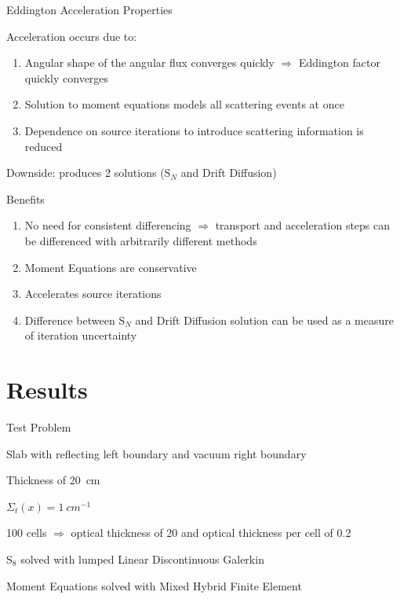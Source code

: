 \documentclass[10pt]{beamer}
\newcommand{\SN}{S$_N$\xspace}
\begin{document}
\begin{frame}{Eddington Acceleration Properties}
    
    Acceleration occurs due to: 
    \begin{enumerate}
    	\item Angular shape of the angular flux converges quickly $\Rightarrow$ Eddington factor quickly converges 

    	\item Solution to moment equations models all scattering events at once 

    	\item Dependence on source iterations to introduce scattering information is reduced

    \end{enumerate}

    Downside: produces 2 solutions (\SN and Drift Diffusion)

    Benefits 
    \begin{enumerate}
    	\item No need for consistent differencing $\Rightarrow$ transport and acceleration steps can be differenced with arbitrarily different methods 

        \item Moment Equations are conservative 

        \item Accelerates source iterations 

        \item Difference between \SN and Drift Diffusion solution can be used as a measure of iteration uncertainty 

    \end{enumerate}

\end{frame}

\section{Results}

\begin{frame}{Test Problem} 

	Slab with reflecting left boundary and vacuum right boundary 

    Thickness of \SI{20}{cm} 

    $\Sigma_t(x) = \SI{1}{cm^{-1}}$

    100 cells $\Rightarrow$ optical thickness of 20 and optical thickness per cell of 0.2 

    S$_8$ solved with lumped Linear Discontinuous Galerkin 

    Moment Equations solved with Mixed Hybrid Finite Element 

\end{frame}
\end{document}
